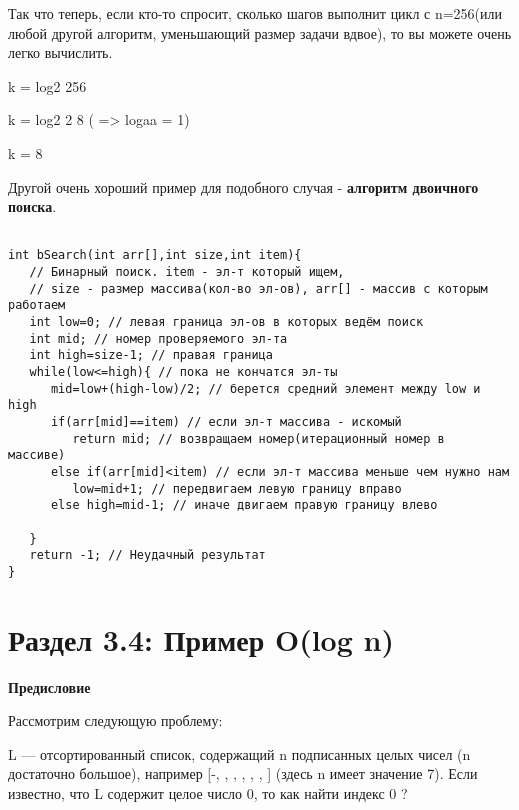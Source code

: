 \vspace{\baselineskip}
Так что теперь, если кто-то спросит, сколько шагов выполнит цикл с n=256(или любой другой алгоритм, уменьшающий размер задачи вдвое), то вы можете очень легко вычислить.

\vspace{\baselineskip}

k = log2 256\newline


k = log2 2 8 ( => logaa = 1)\newline


k = 8\newline


Другой очень хороший пример для подобного случая - \textbf{алгоритм двоичного поиска}.

\begin{tcolorbox}
\begin{verbatim}

int bSearch(int arr[],int size,int item){
   // Бинарный поиск. item - эл-т который ищем, 
   // size - размер массива(кол-во эл-ов), arr[] - массив с которым работаем
   int low=0; // левая граница эл-ов в которых ведём поиск
   int mid; // номер проверяемого эл-та
   int high=size-1; // правая граница
   while(low<=high){ // пока не кончатся эл-ты
      mid=low+(high-low)/2; // берется средний элемент между low и high
      if(arr[mid]==item) // если эл-т массива - искомый
         return mid; // возвращаем номер(итерационный номер в    массиве)
      else if(arr[mid]<item) // если эл-т массива меньше чем нужно нам
         low=mid+1; // передвигаем левую границу вправо
      else high=mid-1; // иначе двигаем правую границу влево

   }
   return -1; // Неудачный результат
}
\end{verbatim}
\end{tcolorbox}

\section*{Раздел 3.4: Пример O(log n)}

\vspace{\baselineskip}
\textbf{Предисловие}

\vspace{\baselineskip}
Рассмотрим следующую проблему:

\vspace{\baselineskip}
L --- отсортированный список, содержащий n подписанных целых чисел (n достаточно большое), например [-{\color{Red}{5}}, {\color{Red}{-2}}, {\color{Red}{-1}}, {\color{Red}{0}}, {\color{Red}{1}}, {\color{Red}{2}}, {\color{Red}{4}}] (здесь n имеет значение 7). Если известно, что L содержит целое число 0, то как найти индекс 0 ?

